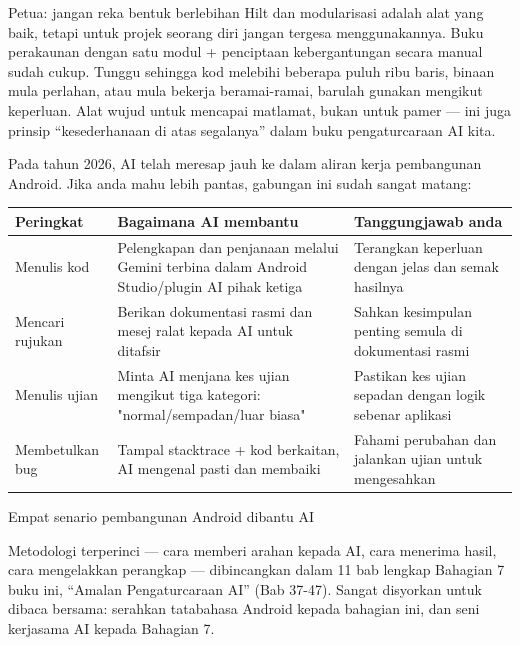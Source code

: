 \begin{tcbinfo}{Petua: jangan reka bentuk berlebihan}
Hilt dan modularisasi adalah alat yang baik, tetapi untuk projek seorang diri jangan tergesa menggunakannya. Buku perakaunan dengan satu modul + penciptaan kebergantungan secara manual sudah cukup. Tunggu sehingga kod melebihi beberapa puluh ribu baris, binaan mula perlahan, atau mula bekerja beramai-ramai, barulah gunakan mengikut keperluan. Alat wujud untuk mencapai matlamat, bukan untuk pamer — ini juga prinsip “kesederhanaan di atas segalanya” dalam buku pengaturcaraan AI kita.

\end{tcbinfo}


Pada tahun 2026, AI telah meresap jauh ke dalam aliran kerja pembangunan Android. Jika anda mahu lebih pantas, gabungan ini sudah sangat matang:

\begin{center}
\begin{tabularx}{\linewidth}{|X|X|X|}
\hline
\textbf{Peringkat} & \textbf{Bagaimana AI membantu} & \textbf{Tanggungjawab anda} \tabularnewline
\hline
Menulis kod & Pelengkapan dan penjanaan melalui Gemini terbina dalam Android Studio/plugin AI pihak ketiga & Terangkan keperluan dengan jelas dan semak hasilnya \tabularnewline
Mencari rujukan & Berikan dokumentasi rasmi dan mesej ralat kepada AI untuk ditafsir & Sahkan kesimpulan penting semula di dokumentasi rasmi \tabularnewline
Menulis ujian & Minta AI menjana kes ujian mengikut tiga kategori: "normal/sempadan/luar biasa" & Pastikan kes ujian sepadan dengan logik sebenar aplikasi \tabularnewline
Membetulkan bug & Tampal stacktrace + kod berkaitan, AI mengenal pasti dan membaiki & Fahami perubahan dan jalankan ujian untuk mengesahkan \tabularnewline
\hline
\end{tabularx}
\end{center}

\begin{center}\small\color{gray}Empat senario pembangunan Android dibantu AI\end{center}

Metodologi terperinci — cara memberi arahan kepada AI, cara menerima hasil, cara mengelakkan perangkap — dibincangkan dalam 11 bab lengkap Bahagian 7 buku ini, “Amalan Pengaturcaraan AI” (Bab 37-47). Sangat disyorkan untuk dibaca bersama: serahkan tatabahasa Android kepada bahagian ini, dan seni kerjasama AI kepada Bahagian 7.

